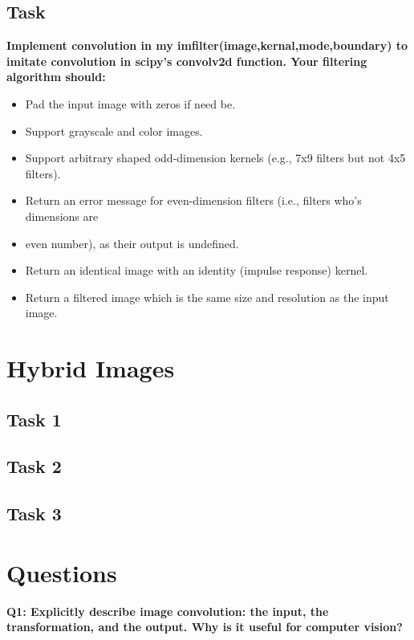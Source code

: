 \documentclass[12pt]{article}
\begin{document}
\subsection{Task}
\textbf{Implement convolution in my imfilter(image,kernal,mode,boundary)
to imitate convolution in scipy’s convolv2d function. Your filtering algorithm should:}
\begin{itemize}
  \item Pad the input image with zeros if need be.
  \item Support grayscale and color images.
  \item Support arbitrary shaped odd-dimension kernels (e.g., 7x9 filters but not 4x5 filters).
  \item Return an error message for even-dimension filters (i.e., filters who’s dimensions are
  \item even number), as their output is undefined.
  \item Return an identical image with an identity (impulse response) kernel.
  \item Return a filtered image which is the same size and resolution as the input image.
\end{itemize}

\newpage
\section{Hybrid Images}

\subsection{Task 1}

\subsection{Task 2}

\subsection{Task 3}

\section{Questions}
\textbf{Q1: Explicitly describe image convolution: the input, the transformation, and the output.
Why is it useful for computer vision?}
\end{document}
